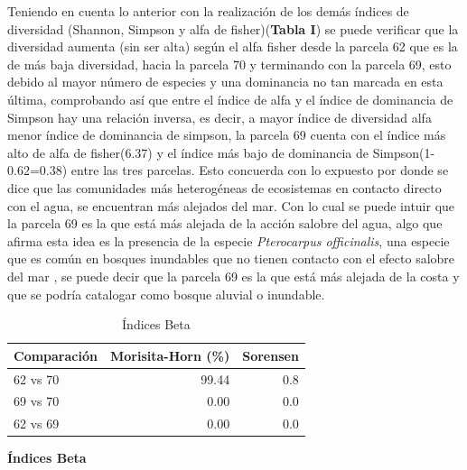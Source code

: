 \documentclass[conference,final,12pt,]{IEEEtran}
\begin{document}
Teniendo en cuenta lo anterior con la realización de los demás índices
de diversidad (Shannon, Simpson y alfa de fisher)(\textbf{Tabla I}) se
puede verificar que la diversidad aumenta (sin ser alta) según el alfa
fisher desde la parcela 62 que es la de más baja diversidad, hacia la
parcela 70 y terminando con la parcela 69, esto debido al mayor número
de especies y una dominancia no tan marcada en esta última, comprobando
así que entre el índice de alfa y el índice de dominancia de Simpson hay
una relación inversa, es decir, a mayor índice de diversidad alfa menor
índice de dominancia de simpson, la parcela 69 cuenta con el índice más
alto de alfa de fisher(6.37) y el índice más bajo de dominancia de
Simpson(1-0.62=0.38) entre las tres parcelas. Esto concuerda con lo
expuesto por \citep{Z} donde se dice que las comunidades más heterogéneas
de ecosistemas en contacto directo con el agua, se encuentran más
alejados del mar. Con lo cual se puede intuir que la parcela 69 es la
que está más alejada de la acción salobre del agua, algo que afirma esta
idea es la presencia de la especie \emph{Pterocarpus officinalis}, una
especie que es común en bosques inundables que no tienen contacto con el
efecto salobre del mar \citep{Y}, se puede decir que la parcela 69 es la
que está más alejada de la costa y que se podría catalogar como bosque
aluvial o inundable.

\begin{table}[htb]

\caption{\label{tab:unnamed-chunk-3}Índices Beta}
\centering
\begin{tabular}[t]{l|r|r}
\hline
Comparación & Morisita-Horn (\%) & Sorensen\\
\hline
62 vs 70 & 99.44 & 0.8\\
\hline
69 vs 70 & 0.00 & 0.0\\
\hline
62 vs 69 & 0.00 & 0.0\\
\hline
\end{tabular}
\end{table}

\textbf{Índices Beta}
\end{document}
